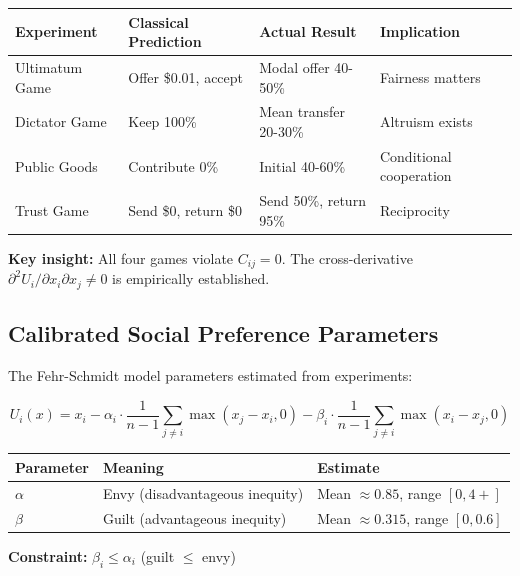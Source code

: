 \begin{center}
\renewcommand{\arraystretch}{1.3}
\begin{tabular}{@{}llll@{}}
\toprule
\textbf{Experiment} & \textbf{Classical Prediction} & \textbf{Actual Result} & \textbf{Implication} \\
\midrule
Ultimatum Game & Offer \$0.01, accept & Modal offer 40-50\% & Fairness matters \\
Dictator Game & Keep 100\% & Mean transfer 20-30\% & Altruism exists \\
Public Goods & Contribute 0\% & Initial 40-60\% & Conditional cooperation \\
Trust Game & Send \$0, return \$0 & Send 50\%, return 95\% & Reciprocity \\
\bottomrule
\end{tabular}
\end{center}

\textbf{Key insight:} All four games violate $C_{ij} = 0$. The cross-derivative
$\partial^2 U_i / \partial x_i \partial x_j \neq 0$ is empirically established.

\subsection{Calibrated Social Preference Parameters}

The Fehr-Schmidt model parameters estimated from experiments:

\begin{equation}
U_i(x) = x_i - \alpha_i \cdot \frac{1}{n-1} \sum_{j \neq i} \max(x_j - x_i, 0)
              - \beta_i \cdot \frac{1}{n-1} \sum_{j \neq i} \max(x_i - x_j, 0)
\label{eq:mp-fehr-schmidt}
\end{equation}

\begin{center}
\renewcommand{\arraystretch}{1.2}
\begin{tabular}{lll}
\toprule
\textbf{Parameter} & \textbf{Meaning} & \textbf{Estimate} \\
\midrule
$\alpha$ & Envy (disadvantageous inequity) & Mean $\approx 0.85$, range $[0, 4+]$ \\
$\beta$ & Guilt (advantageous inequity) & Mean $\approx 0.315$, range $[0, 0.6]$ \\
\bottomrule
\end{tabular}
\end{center}

\textbf{Constraint:} $\beta_i \leq \alpha_i$ (guilt $\leq$ envy)

